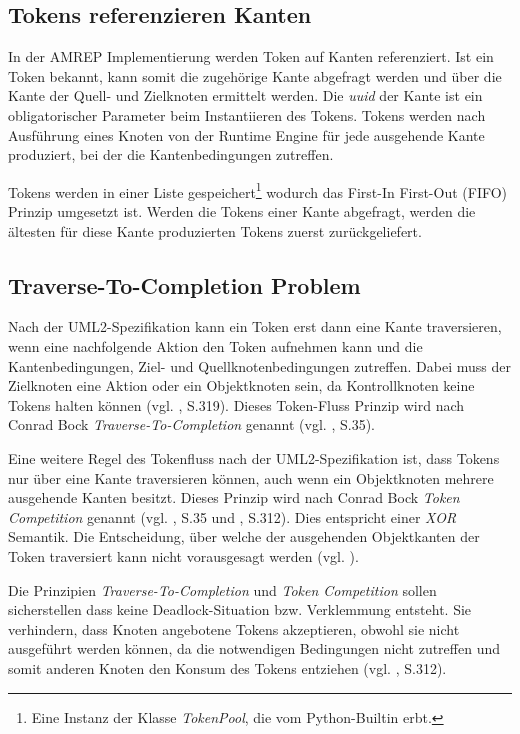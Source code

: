 \subsection{Tokens referenzieren Kanten}\label{token-kanten}
In der AMREP Implementierung werden Token auf Kanten referenziert. Ist ein Token bekannt, kann somit die zugehörige Kante abgefragt werden und über die Kante der Quell- und Zielknoten ermittelt werden. Die \emph{uuid} der Kante ist ein obligatorischer Parameter beim Instantiieren des Tokens. Tokens werden nach Ausführung eines Knoten von der Runtime Engine für jede ausgehende Kante produziert, bei der die Kantenbedingungen zutreffen.

Tokens werden in einer Liste gespeichert\footnote
{Eine Instanz der Klasse \emph{TokenPool}, die vom Python-Builtin  erbt.}
wodurch das First-In First-Out (FIFO) Prinzip umgesetzt ist. Werden die Tokens einer Kante abgefragt, werden die ältesten für diese Kante produzierten Tokens zuerst zurückgeliefert.

\subsection{Traverse-To-Completion Problem}\label{amrep-token-ttc}
Nach der UML2-Spezifikation kann ein Token erst dann eine Kante traversieren, wenn eine nachfolgende Aktion den Token aufnehmen kann und die Kantenbedingungen, Ziel- und Quellknotenbedingungen zutreffen. Dabei muss der Zielknoten eine Aktion oder ein Objektknoten sein, da Kontrollknoten keine Tokens halten können (vgl. \citep{OMG2009}, S.319). Dieses Token-Fluss Prinzip wird nach Conrad Bock \emph{Traverse-To-Completion} genannt (vgl. \citep{Bock2004}, S.35).

Eine weitere Regel des Tokenfluss nach der UML2-Spezifikation ist, dass Tokens nur über eine Kante traversieren können, auch wenn ein Objektknoten mehrere ausgehende Kanten besitzt. Dieses Prinzip wird nach Conrad Bock \emph{Token Competition} genannt (vgl. \citep{Bock2004}, S.35 und \citep{OMG2009}, S.312). %
Dies entspricht einer \emph{XOR} Semantik. Die Entscheidung, über welche der ausgehenden Objektkanten der Token traversiert kann nicht vorausgesagt werden (vgl. \citep{CraneDingel2008}).

Die Prinzipien \emph{Traverse-To-Completion} und \emph{Token Competition} sollen sicherstellen dass keine Deadlock-Situation bzw. Verklemmung entsteht. Sie verhindern, dass Knoten angebotene Tokens akzeptieren, obwohl sie nicht ausgeführt werden können, da die notwendigen Bedingungen nicht zutreffen und somit anderen Knoten den Konsum des Tokens entziehen (vgl. \citep{OMG2009}, S.312).

